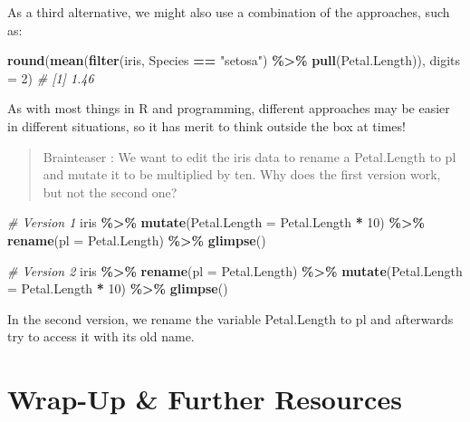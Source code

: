 \documentclass[
]{book}
\newenvironment{Shaded}{\begin{snugshade}}{\end{snugshade}}
\newcommand{\AttributeTok}[1]{\textcolor[rgb]{0.13,0.29,0.53}{#1}}
\newcommand{\CommentTok}[1]{\textcolor[rgb]{0.56,0.35,0.01}{\textit{#1}}}
\newcommand{\DecValTok}[1]{\textcolor[rgb]{0.00,0.00,0.81}{#1}}
\newcommand{\FunctionTok}[1]{\textcolor[rgb]{0.13,0.29,0.53}{\textbf{#1}}}
\newcommand{\NormalTok}[1]{#1}
\newcommand{\SpecialCharTok}[1]{\textcolor[rgb]{0.81,0.36,0.00}{\textbf{#1}}}
\newcommand{\StringTok}[1]{\textcolor[rgb]{0.31,0.60,0.02}{#1}}
\begin{document}
As a third alternative, we might also use a combination of the approaches, such as:

\begin{Shaded}
\begin{Highlighting}[]
\FunctionTok{round}\NormalTok{(}\FunctionTok{mean}\NormalTok{(}\FunctionTok{filter}\NormalTok{(iris, Species }\SpecialCharTok{==} \StringTok{"setosa"}\NormalTok{) }\SpecialCharTok{\%\textgreater{}\%} \FunctionTok{pull}\NormalTok{(Petal.Length)), }\AttributeTok{digits =} \DecValTok{2}\NormalTok{)}
\CommentTok{\# [1] 1.46}
\end{Highlighting}
\end{Shaded}

As with most things in R and programming, different approaches may be easier in different situations, so it has merit to think outside the box at times!

\begin{quote}
Brainteaser :
We want to edit the iris data to rename a Petal.Length to pl and mutate it to be multiplied by ten.
Why does the first version work, but not the second one?
\end{quote}

\begin{Shaded}
\begin{Highlighting}[]
\CommentTok{\# Version 1}
\NormalTok{iris }\SpecialCharTok{\%\textgreater{}\%} 
  \FunctionTok{mutate}\NormalTok{(}\AttributeTok{Petal.Length =}\NormalTok{ Petal.Length }\SpecialCharTok{*} \DecValTok{10}\NormalTok{) }\SpecialCharTok{\%\textgreater{}\%} 
  \FunctionTok{rename}\NormalTok{(}\AttributeTok{pl =}\NormalTok{ Petal.Length) }\SpecialCharTok{\%\textgreater{}\%} 
  \FunctionTok{glimpse}\NormalTok{()}

\CommentTok{\# Version 2}
\NormalTok{iris }\SpecialCharTok{\%\textgreater{}\%} 
  \FunctionTok{rename}\NormalTok{(}\AttributeTok{pl =}\NormalTok{ Petal.Length) }\SpecialCharTok{\%\textgreater{}\%} 
  \FunctionTok{mutate}\NormalTok{(}\AttributeTok{Petal.Length =}\NormalTok{ Petal.Length }\SpecialCharTok{*} \DecValTok{10}\NormalTok{) }\SpecialCharTok{\%\textgreater{}\%} 
  \FunctionTok{glimpse}\NormalTok{()}
\end{Highlighting}
\end{Shaded}

In the second version, we rename the variable Petal.Length to pl and afterwards try to access it with its old name.

\section*{Wrap-Up \& Further Resources}\label{wrapupdplyr}
\end{document}
